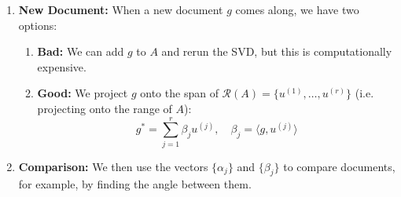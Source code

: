 \begin{example}
\begin{enumerate}
    
        \item \textbf{New Document:} When a new document \( g \) comes along, we have two options: 
        \begin{enumerate}
            \item \textbf{Bad:} We can add \( g \) to \( A \) and rerun the SVD, but this is computationally expensive.
            \item \textbf{Good:} We project \( g \) onto the span of \( \mathcal{R}(A) = \{ u^{(1)}, \ldots, u^{(r)} \} \) (i.e. projecting onto the range of \( A \)):
            \[
            g^* = \sum_{j=1}^{r} \beta_j u^{(j)}, \quad \beta_j = \langle g, u^{(j)} \rangle
            \]
        \end{enumerate}
    
        \item \textbf{Comparison:} We then use the vectors \( \{ \alpha_j \} \) and \( \{ \beta_j \} \) to compare documents, for example, by finding the angle between them.
    \end{enumerate}

\end{example}


